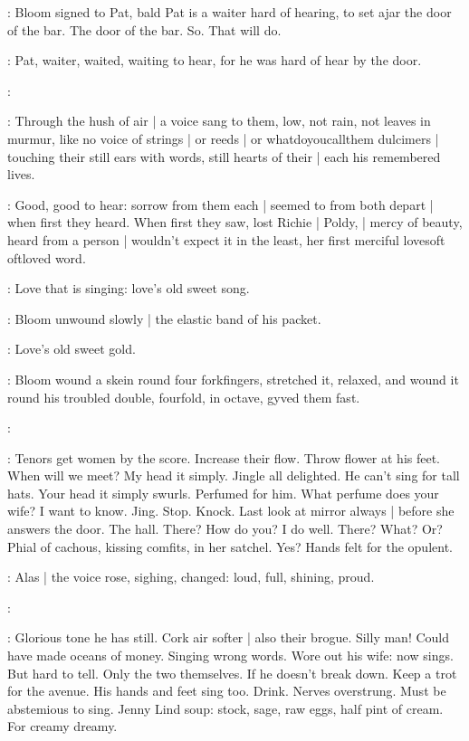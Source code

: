 :
Bloom signed to Pat,
bald Pat is a waiter hard of hearing,
to set ajar the door of the bar.
The door of the bar.
So.
That will do.

:
Pat,
waiter,
waited,
waiting
to hear,
for he was hard of hear by the door.

\simon:

:
Through the hush of air |
a voice sang to them,
low,
not rain,
not leaves
in murmur,
like no voice of strings |
or reeds |
or whatdoyoucallthem dulcimers |
touching their still ears with words,
still hearts of their |
each his remembered lives.

:
Good,
good to hear:
sorrow from them each |
seemed to from both depart |
when first they heard.
When first they saw,
lost Richie |
Poldy, |
mercy of beauty,
heard from a person |
wouldn't expect it in the least,
her first merciful
lovesoft oftloved word.

\BloomInt:
Love that is singing:
love's old sweet song.

:
Bloom unwound slowly |
the elastic band of his packet.

:
Love's old sweet
gold.

:
Bloom wound a skein round four forkfingers,
stretched it,
relaxed,
and wound it round his troubled double,
fourfold,
in octave,
gyved them fast.

\simon:

\BloomInt:
Tenors get women by the score.
Increase their flow.
Throw flower at his feet.
When will we meet?
My head it simply.
Jingle all delighted.
He can't sing for tall hats.
Your head it simply swurls.
Perfumed for him.
What perfume does your wife?
I want to know.
Jing.
Stop.
Knock.
Last look at mirror always |
before she answers the door.
The hall.
There?
How do you?
I do well.
There?
What?
Or?
Phial of cachous,
kissing comfits,
in her satchel.
Yes?
Hands felt for the opulent.

:
Alas |
the voice rose,
sighing,
changed:
loud,
full,
shining,
proud.

\simon:

\BloomInt:
Glorious tone he has still.
Cork air softer |
also their brogue.
Silly man!
Could have made oceans of money.
Singing wrong words.
Wore out his wife:
now sings.
But hard to tell.
Only the two themselves.
If he doesn't break down.
Keep a trot for the avenue.
His hands and feet sing too.
Drink.
Nerves overstrung.
Must be abstemious to sing.
Jenny Lind soup:
stock,
sage,
raw eggs,
half pint of cream.
For creamy dreamy.

